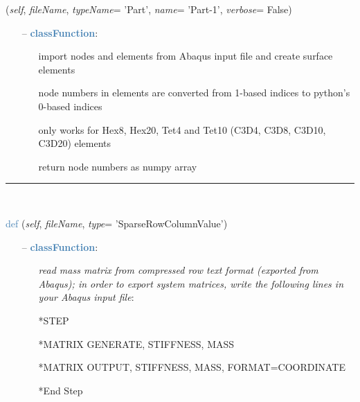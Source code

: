 \begin{itemize}[leftmargin=1.4cm]
\begin{itemize}[leftmargin=1.4cm]
\begin{itemize}[leftmargin=0.5cm]
\begin{itemize}[leftmargin=1.4cm]
\begin{itemize}[leftmargin=1.4cm]
\begin{itemize}[leftmargin=0.5cm]
\begin{flushleft}
({\it self}, {\it fileName}, {\it typeName}= 'Part', {\it name}= 'Part-1', {\it verbose}= False)
\end{flushleft}
\setlength{\itemindent}{0.7cm}
\begin{itemize}[leftmargin=0.7cm]
\item[--]\textcolor{steelblue}{\bf classFunction}: \vspace{-6pt}
\begin{itemize}[leftmargin=1.2cm]
\setlength{\itemindent}{-0.7cm}
\item[]import nodes and elements from Abaqus input file and create surface elements
\item[]node numbers in elements are converted from 1-based indices to python's 0-based indices
\item[]only works for Hex8, Hex20, Tet4 and Tet10 (C3D4, C3D8, C3D10, C3D20) elements
\item[]return node numbers as numpy array
\end{itemize}
\vspace{12pt}\end{itemize}
%
\noindent\rule{8cm}{0.75pt}\vspace{1pt} \\ 
\begin{flushleft}
\noindent \textcolor{steelblue}{def {\bf {}}}\label{sec:FEM:FEMinterface:ReadMassMatrixFromAbaqus}
({\it self}, {\it fileName}, {\it type}= 'SparseRowColumnValue')
\end{flushleft}
\setlength{\itemindent}{0.7cm}
\begin{itemize}[leftmargin=0.7cm]
\item[--]\textcolor{steelblue}{\bf classFunction}: \vspace{-6pt}
\begin{itemize}[leftmargin=1.2cm]
\setlength{\itemindent}{-0.7cm}
\item[]{\it read mass matrix from compressed row text format (exported from Abaqus); in order to export system matrices, write the following lines in your Abaqus input file}:
\item[]*STEP
\item[]*MATRIX GENERATE, STIFFNESS, MASS
\item[]*MATRIX OUTPUT, STIFFNESS, MASS, FORMAT=COORDINATE
\item[]*End Step
\end{itemize}
\vspace{12pt}\end{itemize}

\end{itemize}
\end{itemize}
\end{itemize}
\end{itemize}
\end{itemize}
\end{itemize}
